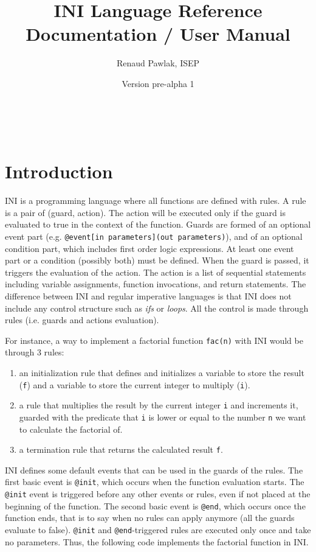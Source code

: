\documentclass[11pt]{article}
\begin{document}
\thispagestyle{empty}

\title{INI Language Reference Documentation / User Manual}
\author{Renaud Pawlak, ISEP}

\date{Version pre-alpha 1}
\maketitle
\

\tableofcontents

\section{Introduction}

INI is a programming language where all functions are defined with rules. A rule is a pair of (guard, action). The action will be executed only if the guard is evaluated to true in the context of the function. Guards are formed of an optional event part (e.g. \texttt{@event[in parameters](out parameters)}), and of an optional condition part, which includes first order logic expressions. At least one event part or a condition (possibly both) must be defined. When the guard is passed, it triggers the evaluation of the action. The action is a list of sequential statements including variable assignments, function invocations, and return statements. The difference between INI and regular imperative languages is that INI does not include any control structure such as \emph{ifs} or \emph{loops}. All the control is made through rules (i.e. guards and actions evaluation).

For instance, a way to implement a factorial function \texttt{fac(n)} with INI would be through 3 rules:

\begin{enumerate}
\item an initialization rule that defines and initializes a variable to store the result (\texttt{f}) and a variable to store the current integer to multiply (\texttt{i}).
\item a rule that multiplies the result by the current integer \texttt{i} and increments it, guarded with the predicate that \texttt{i} is lower or equal to the number \texttt{n} we want to calculate the factorial of.
\item a termination rule that returns the calculated result \texttt{f}.
\end{enumerate}

INI defines some default events that can be used in the guards of the rules. The first basic event is \texttt{@init}, which occurs when the function evaluation starts. The \texttt{@init} event is triggered before any other events or rules, even if not placed at the beginning of the function. The second basic event is \texttt{@end}, which occurs once the function ends, that is to say when no rules can apply anymore (all the guards evaluate to false). \texttt{@init} and \texttt{@end}-triggered rules are executed only once and take no parameters. Thus, the following code implements the factorial function in INI.
\end{document}
